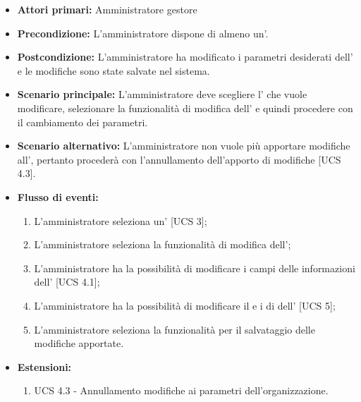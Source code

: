 \begin{itemize}
	\item \textbf{Attori primari:} Amministratore gestore
	\item \textbf{Precondizione:} L'amministratore dispone di almeno un'.
	\item \textbf{Postcondizione:} L'amministratore ha modificato i parametri desiderati dell' e le modifiche sono state salvate nel sistema.
	\item \textbf{Scenario principale:} L'amministratore deve scegliere l' che vuole modificare, selezionare la funzionalità di modifica dell' e quindi procedere con il cambiamento dei parametri.
	\item \textbf{Scenario alternativo:} L'amministratore non vuole più apportare modifiche all', pertanto procederà con l'annullamento dell'apporto di modifiche [UCS 4.3].
	\item \textbf{Flusso di eventi:}
	\begin{enumerate}
		\item L'amministratore seleziona un' [UCS 3];
		\item L'amministratore seleziona la funzionalità di modifica dell';
		\item L'amministratore ha la possibilità di modificare i campi delle informazioni dell' [UCS 4.1];
		\item L'amministratore ha la possibilità di modificare il  e i  di  dell' [UCS 5];
		\item L'amministratore seleziona la funzionalità per il salvataggio delle modifiche apportate.
	\end{enumerate}
	\item \textbf{Estensioni:}
	\begin{enumerate}
		\item UCS 4.3 - Annullamento modifiche ai parametri dell'organizzazione.
	\end{enumerate}
\end{itemize}
\newpage
